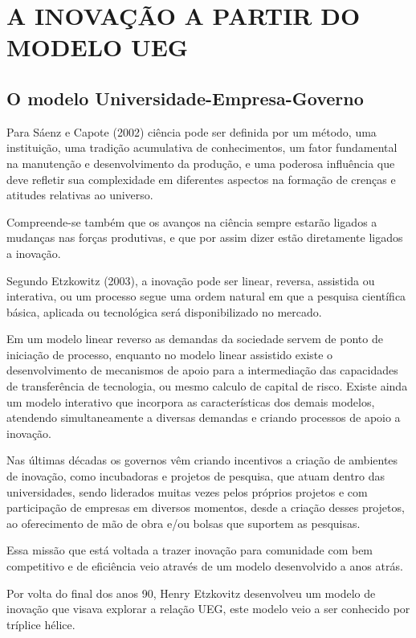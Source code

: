 \chapter{A INOVAÇÃO A PARTIR DO MODELO UEG}
\thispagestyle{empty}

\section{O modelo Universidade-Empresa-Governo}

Para Sáenz e Capote (2002) ciência pode ser definida por um método, uma instituição, uma tradição acumulativa de conhecimentos, um fator fundamental na manutenção e desenvolvimento da produção, e uma poderosa influência que deve refletir sua complexidade em diferentes aspectos na formação de crenças e atitudes relativas ao universo.

Compreende-se também que os avanços na ciência sempre estarão ligados a mudanças nas forças produtivas, e que por assim dizer estão diretamente ligados a inovação.

Segundo Etzkowitz (2003), a inovação pode ser linear, reversa, assistida ou interativa, ou um processo segue uma ordem natural em que a pesquisa científica básica, aplicada ou tecnológica será disponibilizado no mercado.

Em um modelo linear reverso as demandas da sociedade servem de ponto de iniciação de processo, enquanto no modelo linear assistido existe o desenvolvimento de mecanismos de apoio para a intermediação das capacidades de transferência de tecnologia, ou mesmo calculo de capital de risco. Existe ainda um modelo interativo que incorpora as características dos demais modelos, atendendo simultaneamente a diversas demandas e criando processos de apoio a inovação.

Nas últimas décadas os governos vêm criando incentivos a criação de ambientes de inovação, como incubadoras e projetos de pesquisa, que atuam dentro das universidades, sendo liderados muitas vezes pelos próprios projetos e com participação de empresas em diversos momentos, desde a criação desses projetos, ao oferecimento de mão de obra e/ou bolsas que suportem as pesquisas.

Essa missão que está voltada a trazer inovação para comunidade com bem competitivo e de eficiência veio através de um modelo desenvolvido a anos atrás.

Por volta do final dos anos 90, Henry Etzkovitz desenvolveu um modelo de inovação que visava explorar a relação UEG, este modelo veio a ser conhecido por tríplice hélice.


